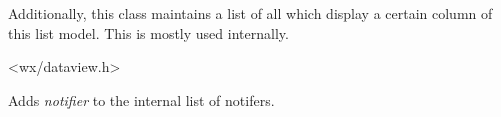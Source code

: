 Additionally, this class maintains a list of all 
 which
display a certain column of this list model. This is
mostly used internally.




<wx/dataview.h>


\label{wxdataviewlistmodelwxdataviewlistmodel}



\label{wxdataviewlistmodeldtor}



\label{wxdataviewlistmodeladdnotifier}


Adds {\it notifier} to the internal list of notifers.

